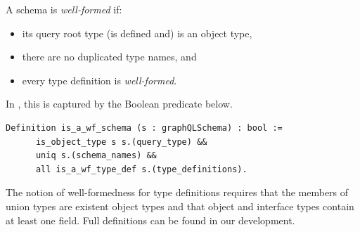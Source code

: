 \begin{definition}
A \gql schema is \textit{well-formed} if: 
\begin{itemize}
    \item its query root type (is defined and) is an object type, 
    \item there are no duplicated type names, and
    \item every type definition is \textit{well-formed}.
\end{itemize}
\end{definition}

In \gcoql, this is captured by the Boolean predicate below. %
%
\begin{verbatim}
Definition is_a_wf_schema (s : graphQLSchema) : bool :=
      is_object_type s s.(query_type) &&
      uniq s.(schema_names) &&
      all is_a_wf_type_def s.(type_definitions).
\end{verbatim}
%
The notion of well-formedness for type definitions requires \eg that
the members of union types are existent object types and that object and
interface types contain at least one field. %
Full definitions can be found in our
\coq development. %




